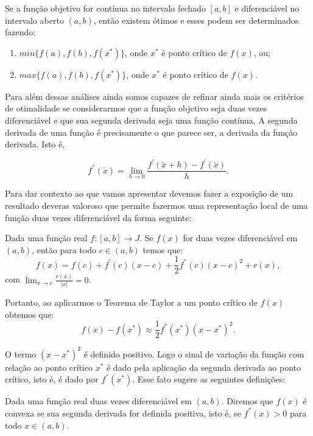 \begin{theorem}
  Se a função objetivo for contínua no intervalo fechado $[a,b]$ e diferenciável no intervalo aberto $(a,b)$, então existem ótimos e esses podem ser determinados fazendo:
  \begin{enumerate}
  \item $min\{f(a), f(b), f(x^{*})\}$, onde $x^{*}$ é ponto crítico de $f(x)$, ou;
  \item $max\{f(a), f(b), f(x^{*})\}$, onde $x^{*}$ é ponto crítico de $f(x)$.
  \end{enumerate}
\end{theorem}

\par Para além dessas análises ainda somos capazes de refinar ainda mais os critérios de otimalidade se considerarmos que a função objetivo seja duas vezes diferenciável e que sua segunda derivada seja uma função contínua. A segunda derivada de uma função é precisamente o que parece ser, a derivada da função derivada. Isto é,

$$ f^{''}(\check{x}) = \lim_{h \rightarrow 0} \frac{f^{'}(\check{x}+h)- f^{'}(\check{x})}{h}.$$

\par Para dar contexto ao que vamos apresentar devemos fazer a exposição de um resultado deveras valoroso que permite fazermos uma representação local de uma função duas vezes diferenciável da forma seguinte:

\begin{theorem}
  Dada uma função real $f:[a,b] \rightarrow J$. Se $f(x)$ for duas vezes diferenciável em $(a,b)$, então para todo $c \in (a,b)$ temos que:
  $$f(x) = f(c)+ f^{'}(c)(x-c) + \frac{1}{2} f^{''}(c)(x-c)^2 + r(x),$$
  com $\lim_{x \rightarrow c}\frac{r(x)}{|x|} = 0$.
\end{theorem}


\par Portanto, ao aplicarmos o Teorema de Taylor a um ponto crítico de $f(x)$ obtemos que:
$$f(x) - f(x^*) \approx \frac{1}{2} f^{''}(x^*)(x-x^*)^2.$$

\par O termo $(x-x^*)^2$ é definido positivo. Logo o sinal de variação da função com relação ao ponto crítico $x^*$ é dado pela aplicação da segunda derivada ao ponto crítico, isto é, é dado por $f^{''}(x^*)$. Esse fato sugere as seguintes definições:

\begin{definition}
  Dada uma função real duas vezes diferenciável em $(a,b)$. Diremos que $f(x)$ é convexa se sua segunda derivada for definida positiva, isto é, se $f^{''}(x) > 0$ para todo $x \in (a,b)$.
\end{definition}

